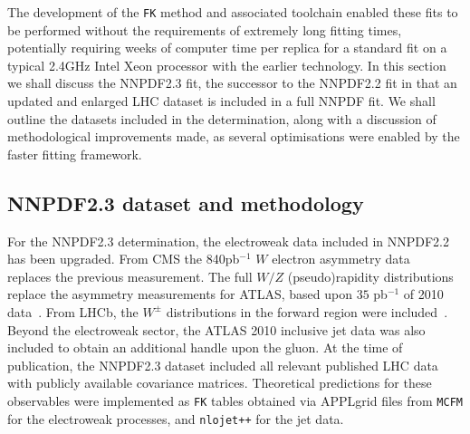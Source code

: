 The development of the {\tt FK} method and associated toolchain enabled these fits to be performed without the requirements of extremely long fitting times, potentially requiring weeks of computer time per replica for a standard fit on a typical 2.4GHz Intel Xeon processor with the earlier technology. In this section we shall discuss the NNPDF2.3 fit, the successor to the NNPDF2.2 fit in that an updated and enlarged LHC dataset is included in a full NNPDF fit. We shall outline the datasets included in the determination, along with a discussion of methodological improvements made, as several optimisations were enabled by the faster fitting framework.

\subsection{NNPDF2.3 dataset and methodology}
\label{sec:23meth}
For the NNPDF2.3 determination, the electroweak data included in NNPDF2.2 has been upgraded. From CMS the 840pb$^{-1}$ $W$ electron asymmetry data~\cite{Chatrchyan:2012xt} replaces the previous measurement. The full $W/Z$ (pseudo)rapidity distributions replace the asymmetry measurements for ATLAS, based upon $35$ pb$^{-1}$ of 2010 data~\cite{Aad:2011dm}. From LHCb, the $W^{\pm}$ distributions in the forward region were included~\cite{Aaij:2012vn}. Beyond the electroweak sector, the ATLAS 2010 inclusive jet data was also included to obtain an additional handle upon the gluon. At the time of publication, the NNPDF2.3 dataset included all relevant published LHC data with publicly available covariance matrices. Theoretical predictions for these observables were implemented as {\tt FK} tables obtained via APPLgrid files from {\tt MCFM} for the electroweak processes, and  {\tt nlojet++} for the jet data.


